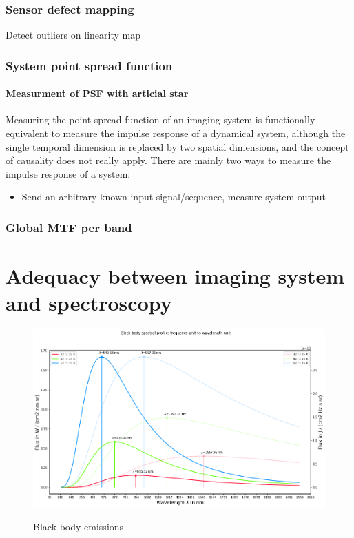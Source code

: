 \documentclass{article}
\begin{document}
    \subsubsection{Sensor defect mapping}
    Detect outliers on linearity map

    \subsubsection{System point spread function}
      \paragraph{Measurment of PSF with articial star}
      Measuring the point spread function of an imaging system is functionally equivalent to measure the impulse response of a dynamical system, although the single temporal dimension is replaced by two spatial dimensions, and the concept of  causality does not really apply.
      There are mainly two ways to measure the impulse response of a system:
      \begin{itemize}
      \item Send an arbitrary known input signal/sequence, measure system output
      \end{itemize}

  \subsubsection{Global MTF per band}



\section{Adequacy between imaging system and spectroscopy}

\begin{figure}[h!]
  \includegraphics[width=1.0\textwidth]{../../figures/black_body_planck.png}\\
  \caption{Black body emissions}
\end{figure}
\end{document}
